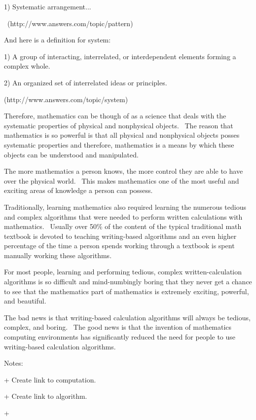 \documentclass[12pt,twoside]{book}
\begin{document}
\bigskip

1) Systematic arrangement...

\ (http://www.answers.com/topic/pattern)


\bigskip

And here is a definition for system:


\bigskip

1) A group of interacting, interrelated, or interdependent elements
forming a complex whole.


\bigskip

2) An organized set of interrelated ideas or principles.

(http://www.answers.com/topic/system)


\bigskip

Therefore, mathematics can be though of as a science that deals with the
systematic properties of physical and nonphysical objects. \ The reason
that mathematics is so powerful is that all physical and nonphysical
objects posses systematic properties and therefore, mathematics is a
means by which these objects can be understood and manipulated.


\bigskip

The more mathematics a person knows, the more control they are able to
have over the physical world. \ This makes mathematics one of the most
useful and exciting areas of knowledge a person can possess.


\bigskip

Traditionally, learning mathematics also required learning the numerous
tedious and complex algorithms that were needed to perform written
calculations with mathematics. \ Usually over 50\% of the content of
the typical traditional math textbook is devoted to teaching
writing{}-based algorithms and an even higher percentage of the time a
person spends working through a textbook is spent manually working
these algorithms.


\bigskip

For most people, learning and performing tedious, complex
written{}-calculation algorithms is so difficult and mind{}-numbingly
boring that they never get a chance to see that the
{\textquotedbl}mathematics{\textquotedbl} part of mathematics is
extremely exciting, powerful, and beautiful.


\bigskip

The bad news is that writing{}-based calculation algorithms will always
be tedious, complex, and boring. \ The good news is that the invention
of mathematics computing environments has significantly reduced the
need for people to use writing{}-based calculation algorithms.


\bigskip


\bigskip

Notes:


\bigskip

+ Create link to {\textquotedbl}computation{\textquotedbl}.

+ Create link to {\textquotedbl}algorithm{\textquotedbl}.

+

\backmatter
\end{document}
